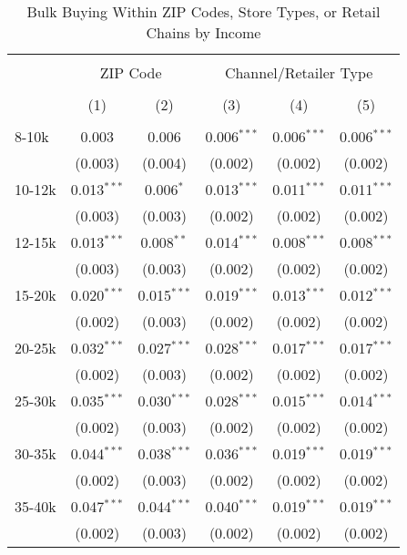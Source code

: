 
\begin{table}[!htbp] \centering 
  \caption{Bulk Buying Within ZIP Codes, Store Types, or Retail Chains by Income} 
  \label{tab:discountingBehaviorFEAll} 
\begin{tabular}{@{\extracolsep{5pt}}lccccc} 
\\[-1.8ex]\hline 
\hline \\[-1.8ex] 
 & \multicolumn{2}{c}{ZIP Code} & \multicolumn{3}{c}{Channel/Retailer Type} \\ 
\\[-1.8ex] & (1) & (2) & (3) & (4) & (5)\\ 
\hline \\[-1.8ex] 
 8-10k & 0.003 & 0.006 & 0.006$^{***}$ & 0.006$^{***}$ & 0.006$^{***}$ \\ 
  & (0.003) & (0.004) & (0.002) & (0.002) & (0.002) \\ 
  10-12k & 0.013$^{***}$ & 0.006$^{*}$ & 0.013$^{***}$ & 0.011$^{***}$ & 0.011$^{***}$ \\ 
  & (0.003) & (0.003) & (0.002) & (0.002) & (0.002) \\ 
  12-15k & 0.013$^{***}$ & 0.008$^{**}$ & 0.014$^{***}$ & 0.008$^{***}$ & 0.008$^{***}$ \\ 
  & (0.003) & (0.003) & (0.002) & (0.002) & (0.002) \\ 
  15-20k & 0.020$^{***}$ & 0.015$^{***}$ & 0.019$^{***}$ & 0.013$^{***}$ & 0.012$^{***}$ \\ 
  & (0.002) & (0.003) & (0.002) & (0.002) & (0.002) \\ 
  20-25k & 0.032$^{***}$ & 0.027$^{***}$ & 0.028$^{***}$ & 0.017$^{***}$ & 0.017$^{***}$ \\ 
  & (0.002) & (0.003) & (0.002) & (0.002) & (0.002) \\ 
  25-30k & 0.035$^{***}$ & 0.030$^{***}$ & 0.028$^{***}$ & 0.015$^{***}$ & 0.014$^{***}$ \\ 
  & (0.002) & (0.003) & (0.002) & (0.002) & (0.002) \\ 
  30-35k & 0.044$^{***}$ & 0.038$^{***}$ & 0.036$^{***}$ & 0.019$^{***}$ & 0.019$^{***}$ \\ 
  & (0.002) & (0.003) & (0.002) & (0.002) & (0.002) \\ 
  35-40k & 0.047$^{***}$ & 0.044$^{***}$ & 0.040$^{***}$ & 0.019$^{***}$ & 0.019$^{***}$ \\ 
  & (0.002) & (0.003) & (0.002) & (0.002) & (0.002) \\ 

\end{tabular}
\end{table}
